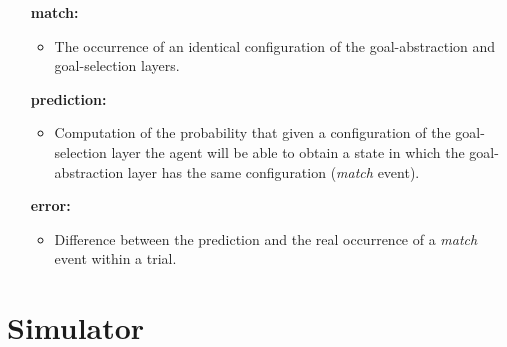 \documentclass[11pt]{article}
\begin{document}
\begin{itemize}[leftmargin=3cm]  

    \item[\textbf{match:}]

        \begin{itemize}

            \item The occurrence of an identical configuration of the
                goal-abstraction and goal-selection layers. 

        \end{itemize}    

    \item[\textbf{prediction:}]

        \begin{itemize}

            \item Computation of the probability that given a configuration of
                the goal-selection layer the agent will be able to obtain a state in which
                the goal-abstraction layer has the same configuration
                (\emph{match} event). 

        \end{itemize}  

    \item[\textbf{error:}]

        \begin{itemize}

            \item Difference between the prediction and the real occurrence of
                a \emph{match} event within a trial.

        \end{itemize}  

\end{itemize} 

\section{Simulator}
\label{sec:simulator}
\end{document}
